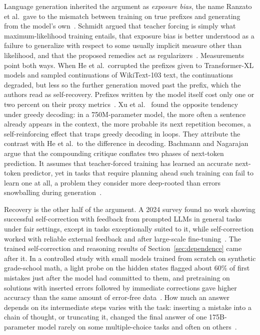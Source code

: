 \documentclass{ieeeaccess}
\begin{document}
Language generation inherited the argument as \emph{exposure bias}, the name Ranzato et al.\ gave to the mismatch between training on true prefixes and generating from the model's own~\cite{ranzato2016sequence}. Schmidt argued that teacher forcing is simply what maximum-likelihood training entails, that exposure bias is better understood as a failure to generalize with respect to some usually implicit measure other than likelihood, and that the proposed remedies act as regularizers~\cite{schmidt2019generalization}. Measurements point both ways. When He et al.\ corrupted the prefixes given to Transformer-XL models and sampled continuations of WikiText-103 text, the continuations degraded, but less so the further generation moved past the prefix, which the authors read as self-recovery. Prefixes written by the model itself cost only one or two percent on their proxy metrics~\cite{he2021exposure}. Xu et al.~\cite{xu2022loop} found the opposite tendency under greedy decoding: in a 750M-parameter model, the more often a sentence already appears in the context, the more probable its next repetition becomes, a self-reinforcing effect that traps greedy decoding in loops. They attribute the contrast with He et al.\ to the difference in decoding. Bachmann and Nagarajan argue that the compounding critique conflates two phases of next-token prediction. It assumes that teacher-forced training has learned an accurate next-token predictor, yet in tasks that require planning ahead such training can fail to learn one at all, a problem they consider more deep-rooted than errors snowballing during generation~\cite{bachmann2024pitfalls}.

Recovery is the other half of the argument. A 2024 survey found no work showing successful self-correction with feedback from prompted LLMs in general tasks under fair settings, except in tasks exceptionally suited to it, while self-correction worked with reliable external feedback and after large-scale fine-tuning~\cite{kamoi2024selfcorrect}. The trained self-correction and reasoning results of Section~\ref{sec:dependence} came after it. In a controlled study with small models trained from scratch on synthetic grade-school math, a light probe on the hidden states flagged about 60\% of first mistakes just after the model had committed to them, and pretraining on solutions with inserted errors followed by immediate corrections gave higher accuracy than the same amount of error-free data~\cite{ye2025physics22}. How much an answer depends on its intermediate steps varies with the task: inserting a mistake into a chain of thought, or truncating it, changed the final answer of one 175B-parameter model rarely on some multiple-choice tasks and often on others~\cite{lanham2023measuring}.
\end{document}
